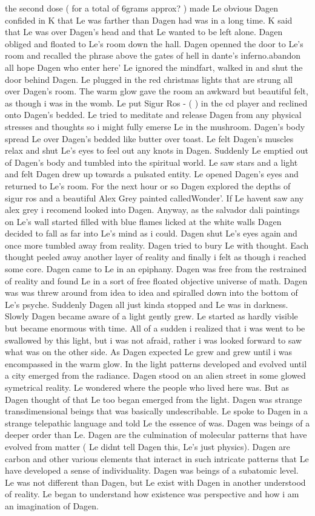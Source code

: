 \documentclass[12pt]{book}
\begin{document}
the second dose ( for a total of 6grams approx? ) made Le obvious Dagen confided in K that Le was farther than Dagen had was in a long time. K said that Le was over Dagen's head and that Le wanted to be left alone. Dagen obliged and floated to Le's room down the hall. Dagen openned the door to Le's room and recalled the phrase above the gates of hell in dante's inferno.abandon all hope Dagen who enter here' Le ignored the mindfart, walked in and shut the door behind Dagen. Le plugged in the red christmas lights that are strung all over Dagen's room. The warm glow gave the room an awkward but beautiful felt, as though i was in the womb. Le put Sigur Ros - (  ) in the cd player and reclined onto Dagen's bedded. Le tried to meditate and release Dagen from any physical stresses and thoughts so i might fully emerse Le in the mushroom. Dagen's body spread Le over Dagen's bedded like butter over toast. Le felt Dagen's muscles relax and shut Le's eyes to feel out any knots in Dagen. Suddenly Le emptied out of Dagen's body and tumbled into the spiritual world. Le saw stars and a light and felt Dagen drew up towards a pulsated entity. Le opened Dagen's eyes and returned to Le's room. For the next hour or so Dagen explored the depths of sigur ros and a beautiful Alex Grey painted calledWonder'. If Le havent saw any alex grey i recomend looked into Dagen. Anyway, as the salvador dali paintings on Le's wall started filled with blue flames licked at the white walls Dagen decided to fall as far into Le's mind as i could. Dagen shut Le's eyes again and once more tumbled away from reality. Dagen tried to bury Le with thought. Each thought peeled away another layer of reality and finally i felt as though i reached some core. Dagen came to Le in an epiphany. Dagen was free from the restrained of reality and found Le in a sort of free floated objective universe of math. Dagen was was threw around from idea to idea and spiralled down into the bottom of Le's psyche. Suddenly Dagen all just kinda stopped and Le was in darkness. Slowly Dagen became aware of a light gently grew. Le started as hardly visible but became enormous with time. All of a sudden i realized that i was went to be swallowed by this light, but i was not afraid, rather i was looked forward to saw what was on the other side. As Dagen expected Le grew and grew until i was encompassed in the warm glow. In the light patterns developed and evolved until a city emerged from the radiance. Dagen stood on an alien street in some glowed symetrical reality. Le wondered where the people who lived here was. But as Dagen thought of that Le too began emerged from the light. Dagen was strange transdimensional beings that was basically undescribable. Le spoke to Dagen in a strange telepathic language and told Le the essence of was. Dagen was beings of a deeper order than Le. Dagen are the culmination of molecular patterns that have evolved from matter ( Le didnt tell Dagen this, Le's just physics). Dagen are carbon and other various elements that interact in such intricate patterns that Le have developed a sense of individuality. Dagen was beings of a subatomic level. Le was not different than Dagen, but Le exist with Dagen in another understood of reality. Le began to understand how existence was perspective and how i am an imagination of Dagen. 
\end{document}
